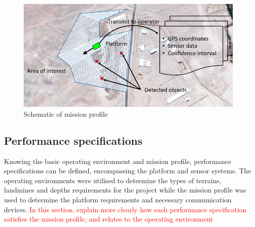 \documentclass[main.tex]{subfiles}
\begin{document}
\begin{figure}[ht]
\centering
\includegraphics[width=\textwidth]{1-Introduction/SoO.PNG}
\caption{Schematic of mission profile}
\end{figure}

\subsection{Performance specifications}
Knowing the basic operating environment and mission profile, performance specifications can be defined, encompassing the platform and sensor systems. The operating environments were utilised to determine the types of terrains, landmines and depths requirements for the project while the mission profile was used to determine the platform requirements and necessary communication devices.   \textcolor{red}{In this section, explain more clearly how each performance specification satisfies the mission profile, and relates to the operating environment}
\end{document}
